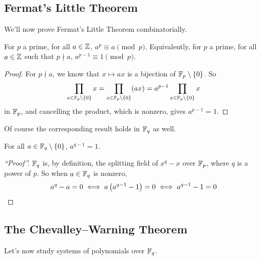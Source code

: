 \subsection{Fermat's Little Theorem}

We'll now prove Fermat's Little Theorem combinatorially.

\begin{boxtheorem}
    For $p$ a prime, for all $a \in \mathbb{Z}$, $a^p \equiv a \pmod{p}$. Equivalently, for $p$ a prime, for all $a \in \mathbb{Z}$ such that $p \nmid a$, $a^{p - 1} \equiv 1 \pmod{p}$.
\end{boxtheorem}
\begin{proof}
    For $p \nmid a$, we know that $x \mapsto ax$ is a bijection of $\mathbb{F}_p \setminus \left\{ 0 \right\}$. So
    \begin{align*}
        \prod_{x \in \mathbb{F}_p \setminus \left\{ 0 \right\}} x
        = \prod_{x \in \mathbb{F}_p \setminus \left\{ 0 \right\}} (ax)
        = a^{p - 1} \prod_{x \in \mathbb{F}_p \setminus \left\{ 0 \right\}} x
    \end{align*}
    in $\mathbb{F}_p$, and cancelling the product, which is nonzero, gives $a^{p - 1} = 1$.
\end{proof}

Of course the corresponding result holds in $\mathbb{F}_q$ as well.

\begin{boxtheorem}
    For all $a \in \mathbb{F}_q \setminus \left\{ 0 \right\}$, $a^{q - 1} = 1$.
\end{boxtheorem}
\begin{proof}[``Proof'']
    $\mathbb{F}_q$ is, by definition, the splitting field of $x^{q} - x$ over $\mathbb{F}_p$, where $q$ is a power of $p$. So when $a \in \mathbb{F}_q$ is nonzero,
    \begin{align*}
        a^q - a = 0 \iff a\left( a^{q - 1} - 1 \right) = 0 \iff a^{q - 1} - 1 = 0
    \end{align*}
\end{proof}

\subsection{The Chevalley--Warning Theorem}

Let's now study systems of polynomials over $\mathbb{F}_q$.

